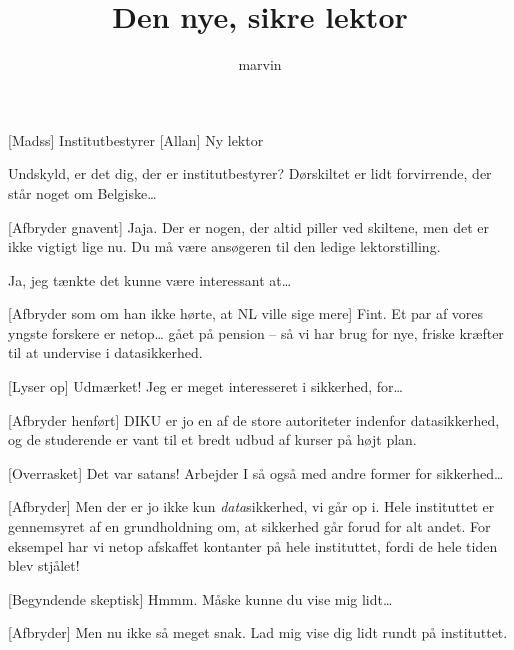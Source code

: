 \documentclass[a4paper,11pt]{article}
\title{Den nye, sikre lektor}
\author{marvin}
\begin{document}
\maketitle

\begin{roles}
[Madss] Institutbestyrer
[Allan] Ny lektor
\end{roles}

\begin{props}
\end{props}

  
\begin{sketch}

 
Undskyld, er det dig, der er institutbestyrer? Dørskiltet er lidt forvirrende,
  der står noget om Belgiske\ldots

[Afbryder gnavent] Jaja. Der er nogen, der altid piller ved skiltene, men
det er ikke vigtigt lige nu. Du må være ansøgeren til den ledige
lektorstilling.

 Ja, jeg tænkte det kunne være interessant at\ldots

[Afbryder som om han ikke hørte, at NL ville sige mere] Fint. Et par
af vores  yngste forskere er netop\ldots {} gået på pension -- så vi har brug for nye, friske kræfter til
at undervise i datasikkerhed.

[Lyser op] Udmærket! Jeg er meget interesseret i sikkerhed, for\ldots

[Afbryder henført] DIKU er jo en af de store autoriteter indenfor
datasikkerhed, og de studerende er vant til et bredt udbud af kurser på højt
plan.

[Overrasket] Det var satans! Arbejder I så også med andre former for
sikkerhed\ldots

[Afbryder] Men der er jo ikke kun \emph{data}sikkerhed, vi går op
i. Hele instituttet er gennemsyret af en grundholdning om, at sikkerhed går
forud for alt andet. For eksempel har vi netop afskaffet kontanter på hele
instituttet, fordi de hele tiden blev stjålet!

[Begyndende skeptisk] Hmmm. Måske kunne du vise mig lidt\ldots

[Afbryder] Men nu ikke så meget snak. Lad mig vise dig lidt rundt på
instituttet.


\end{sketch}
\end{document}
